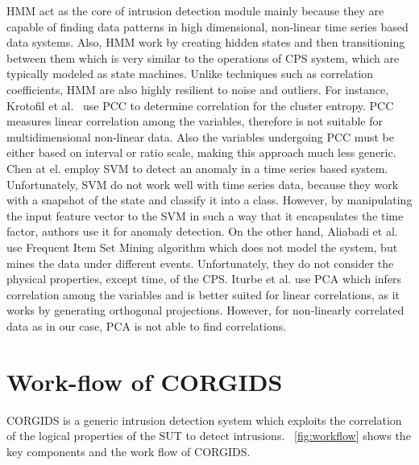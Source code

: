 \ac{HMM} act as the core of intrusion detection module mainly because they are capable of finding data patterns in high dimensional, non-linear time series based data systems. Also, \ac{HMM} work by creating hidden states and then transitioning between them which is very similar to the operations of \ac{CPS} system, which are typically modeled as state machines.
Unlike techniques such as correlation coefficients, \ac{HMM} are also highly resilient to noise and outliers. 
For instance, Krotofil et al.~\cite{krotofil2015process} use \ac{PCC} to determine correlation for the cluster entropy. \ac{PCC} measures linear correlation among the variables, therefore is not suitable for multidimensional non-linear data. Also the variables undergoing \ac{PCC} must be either based on interval or ratio scale, making this approach much less generic. Chen at el.  \cite{chen2018learning} employ \ac{SVM} to detect an anomaly in a time series based system. Unfortunately, \ac{SVM} do not work well with time series data, because they work with a snapshot of the state and classify it into a class. However, by manipulating the input feature vector to the \ac{SVM} in such a way that it encapsulates the time factor, authors use it for anomaly detection. On the other hand, Aliabadi et al. ~\cite{aliabadi2017artinali} use Frequent Item Set Mining algorithm which does not model the system, but mines the data under different events. Unfortunately, they do not consider the physical properties, except time, of the \ac{CPS}. Iturbe et al. \cite{iturbe2017feasibility} use \ac{PCA} which infers correlation among the variables and is better suited for linear correlations, as it works by generating orthogonal projections. However, for non-linearly correlated data as in our case, \ac{PCA} is not able to find correlations.

\section{Work-flow of CORGIDS}
\ac{CORGIDS} is a generic intrusion detection system which exploits the correlation of the logical properties of the \ac{SUT} to detect intrusions. ~\autoref{fig:workflow} shows the key components and the work flow of \ac{CORGIDS}.

